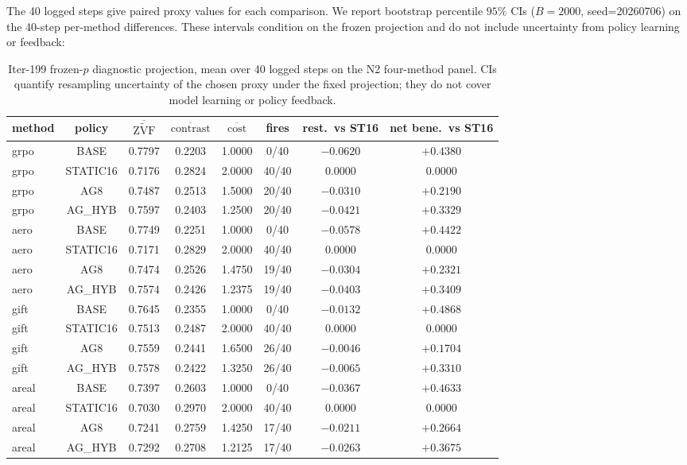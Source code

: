 \documentclass{article}
\newcommand{\zvf}{\ensuremath{\widetilde{\mathrm{ZVF}}}}
\begin{document}
The 40 logged steps give paired proxy values for each comparison. We report
bootstrap percentile $95\%$ CIs ($B=2000$, seed=20260706) on the 40-step
per-method differences. These intervals condition on the frozen projection and
do not include uncertainty from policy learning or feedback:

\begin{table}[h]
\centering\small
\caption{Iter-199 frozen-$p$ diagnostic projection, mean over 40 logged steps
on the N2 four-method panel. CIs quantify resampling uncertainty of the chosen
proxy under the fixed projection; they do not cover model learning or policy
feedback.}
\label{tab:iter199-trajectory}
\vspace{2pt}
\begin{tabular}{l c c c c c c c}
\toprule
method & policy & $\overline{\zvf}$ & $\overline{\mathrm{contrast}}$ &
$\overline{\mathrm{cost}}$ & fires & rest.\ vs ST16 & net bene.\ vs ST16 \\
\midrule
grpo & BASE     & 0.7797 & 0.2203 & 1.0000 &  0/40 & $-0.0620$ & $+0.4380$ \\
grpo & STATIC16 & 0.7176 & 0.2824 & 2.0000 & 40/40 &  $0.0000$ &  $0.0000$ \\
grpo & AG8      & 0.7487 & 0.2513 & 1.5000 & 20/40 & $-0.0310$ & $\mathbf{+0.2190}$ \\
grpo & AG\_HYB  & 0.7597 & 0.2403 & 1.2500 & 20/40 & $-0.0421$ & $\mathbf{+0.3329}$ \\
\midrule
aero & BASE     & 0.7749 & 0.2251 & 1.0000 &  0/40 & $-0.0578$ & $+0.4422$ \\
aero & STATIC16 & 0.7171 & 0.2829 & 2.0000 & 40/40 &  $0.0000$ &  $0.0000$ \\
aero & AG8      & 0.7474 & 0.2526 & 1.4750 & 19/40 & $-0.0304$ & $\mathbf{+0.2321}$ \\
aero & AG\_HYB  & 0.7574 & 0.2426 & 1.2375 & 19/40 & $-0.0403$ & $\mathbf{+0.3409}$ \\
\midrule
gift & BASE     & 0.7645 & 0.2355 & 1.0000 &  0/40 & $-0.0132$ & $+0.4868$ \\
gift & STATIC16 & 0.7513 & 0.2487 & 2.0000 & 40/40 &  $0.0000$ &  $0.0000$ \\
gift & AG8      & 0.7559 & 0.2441 & 1.6500 & 26/40 & $-0.0046$ & $\mathbf{+0.1704}$ \\
gift & AG\_HYB  & 0.7578 & 0.2422 & 1.3250 & 26/40 & $-0.0065$ & $\mathbf{+0.3310}$ \\
\midrule
areal & BASE    & 0.7397 & 0.2603 & 1.0000 &  0/40 & $-0.0367$ & $+0.4633$ \\
areal & STATIC16 & 0.7030 & 0.2970 & 2.0000 & 40/40 &  $0.0000$ &  $0.0000$ \\
areal & AG8      & 0.7241 & 0.2759 & 1.4250 & 17/40 & $-0.0211$ & $\mathbf{+0.2664}$ \\
areal & AG\_HYB  & 0.7292 & 0.2708 & 1.2125 & 17/40 & $-0.0263$ & $\mathbf{+0.3675}$ \\
\bottomrule
\end{tabular}
\end{table}
\end{document}
